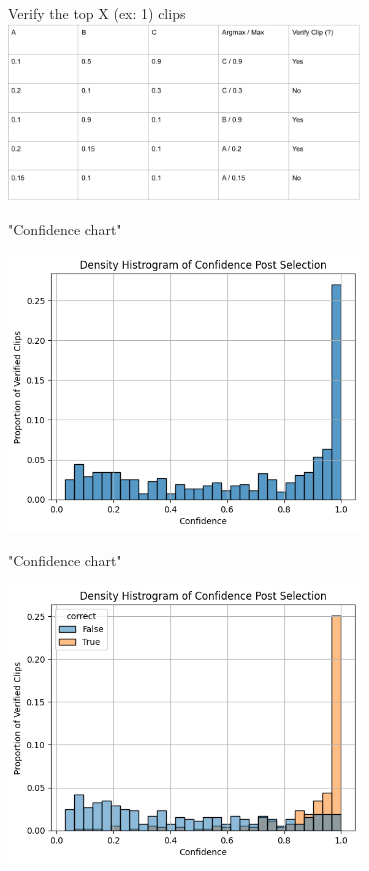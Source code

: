 \begin{frame}{Verify the top X (ex: 1) clips}
    \centering
    \includegraphics[height=0.7\textheight,width=0.7\textwidth,keepaspectratio]{./images/clip_selection_process.png}
\end{frame}

\begin{frame}{"Confidence chart"}

    \centering
    \includegraphics[height=0.7\textheight,width=0.7\textwidth,keepaspectratio]{./images/prop_confidence.png}

\end{frame}

\begin{frame}{"Confidence chart"}

    \centering
    \includegraphics[height=0.7\textheight,width=0.7\textwidth,keepaspectratio]{./images/prop_confidence_facet.png}

\end{frame}

